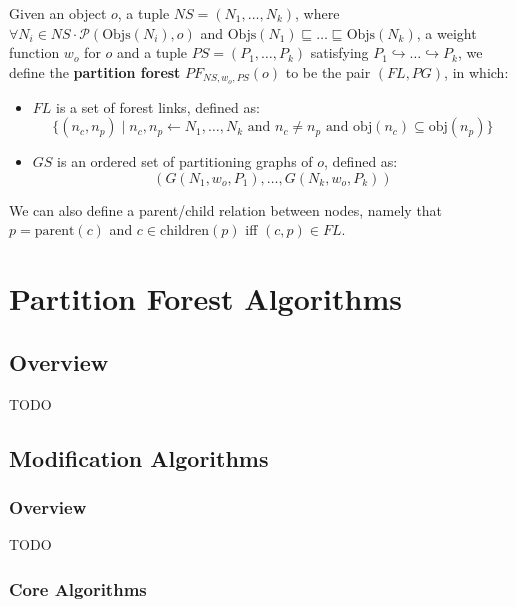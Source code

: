 \begin{definition}
Given an object $o$, a tuple $NS = (N_1,\ldots,N_k)$, where $\forall N_i \in NS \cdot \mathcal{P}(\mbox{Objs}(N_i),o)$ and $\mbox{Objs}(N_1) \sqsubseteq \ldots \sqsubseteq \mbox{Objs}(N_k)$, a weight function $w_o$ for $o$ and a tuple $PS = (P_1,\ldots,P_k)$ satisfying $P_1 \hookrightarrow \ldots \hookrightarrow P_k$, we define the \textbf{partition forest} $PF_{NS,w_o,PS}(o)$ to be the pair $(FL,PG)$, in which:

\begin{itemize}

\item $FL$ is a set of forest links, defined as:
%
\[
\{(n_c,n_p) \; | \; n_c, n_p \leftarrow N_1,\ldots,N_k \mbox{ and } n_c \ne n_p \mbox{ and } \mbox{obj}(n_c) \subseteq \mbox{obj}(n_p)\}
\]

\item $GS$ is an ordered set of partitioning graphs of $o$, defined as:
%
\[
(G(N_1,w_o,P_1),\ldots,G(N_k,w_o,P_k))
\]

\end{itemize}

\noindent We can also define a parent/child relation between nodes, namely that $p = \mbox{parent}(c)$ and $c \in \mbox{children}(p)$ iff $(c,p) \in FL$.

\end{definition}

\section{Partition Forest Algorithms}
\label{sec:ipfs-algorithms}

\subsection{Overview}

TODO

\subsection{Modification Algorithms}

\subsubsection{Overview}

TODO

\subsubsection{Core Algorithms}

